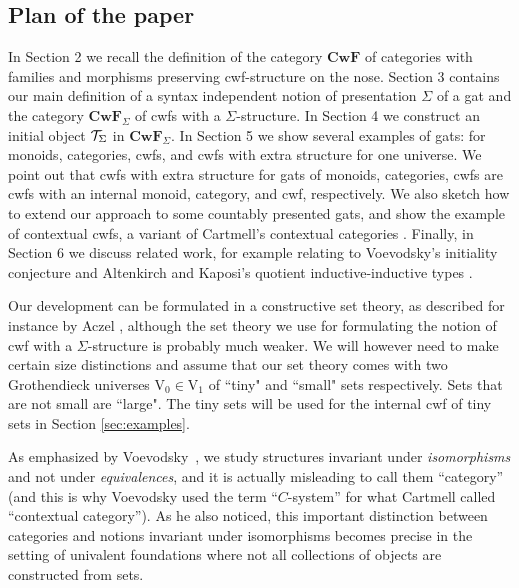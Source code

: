 \documentclass{lmcs}
\newcommand{\FYI}[1]{{\color{red}#1}}
\def\V{\mathrm{V}}
\def\Cwf{\mathbf{CwF}}
\begin{document}

\subsection*{Plan of the paper}

In Section 2 we recall the definition of the category $\Cwf$ of categories with families and morphisms preserving cwf-structure on the nose. Section 3 contains our main definition of a syntax independent notion of \FYI{presentation} $\Sigma$ of a gat and the category $\Cwf_\Sigma$ of cwfs with a $\Sigma$-structure. In Section 4 we construct an initial object ${\mathcal T}_\Sigma$ in $\Cwf_\Sigma$. In Section 5 we show several examples of gats: for monoids, categories, cwfs, and cwfs with extra structure for one universe. We point out that cwfs with extra structure for gats of monoids, categories, cwfs are cwfs with an internal monoid, category, and cwf, respectively. We also sketch how to extend our approach to some countably presented gats, and show the example of contextual cwfs, a variant of Cartmell's contextual categories \cite{cartmell:phd,cartmell:apal}. Finally, in Section 6 we discuss related work, for example relating to Voevodsky's initiality conjecture \cite{voevodsky:initiality} and Altenkirch and Kaposi's quotient inductive-inductive types \cite{altenkirch:qiits}.

Our development can be formulated in a constructive set theory,
as described for instance by Aczel \cite{MR519801,aczel:relate}, although the set theory
we use for formulating the notion of cwf with a $\Sigma$-structure is probably
much weaker. We will however need to make certain size distinctions and assume that our set theory comes with two Grothendieck universes $\V_0 \in \V_1$ of ``tiny" and ``small" sets respectively. Sets that are not small are ``large". The tiny sets will be used for the internal cwf of tiny sets in Section \ref{sec:examples}.

As emphasized by Voevodsky~\cite{voevodsky:initiality}, we study structures invariant
under {\em isomorphisms} and not under {\em equivalences}, and it is actually misleading
to call them ``category'' (and this is why Voevodsky used the term ``$C$-system''
for what Cartmell called ``contextual category'').
As he also noticed, this
important distinction between categories and notions invariant under isomorphisms becomes
precise in the setting of univalent foundations where not all collections of objects
are constructed from sets.
\end{document}

